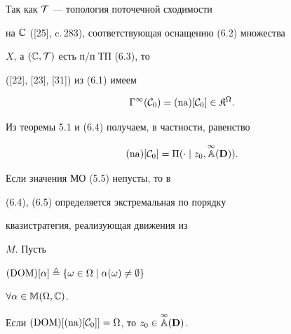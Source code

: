 Так как ${\cal T}$ --- топология поточечной сходимости


на ${\Bbb C}$ ([25], c.\,283), соответствующая оснащению (6.2) множества


$X$, а $({\Bbb C},{\cal T})$ есть п/п ТП (6.3), то


([22], [23], [31]) из (6.1) имеем


\begin{equation}


{{\Gm}^\infty}({\cal C}_0) = (\na)[{\cal C}_0] \in {{\frak K}^\Om}.


\end{equation}


Из теоремы 5.1 и (6.4) получаем, в частности, равенство


\begin{equation}


(\na)[{\cal C}_0] = {\Pi}(\cdot \mid {z_0},\up{\infty}{\Bbb A}({\bold


D})).


\end{equation}


Если значения МО (5.5) непусты, то в


(6.4), (6.5) определяется экстремальная по порядку


квазистратегия, реализующая движения из


$M$. Пусть


${(\DOM)[\alpha]}


\stac \{\omega \in \Om \mid {{\alpha}(\omega)} \ne \emp\}$


$\forall{\alpha} \in {\Bbb M}(\Omega,{\Bbb C})$.





\begin{props}


Если ${(\DOM)[(\na)[{\cal C}_0]]} = \Om$, то ${z_0} \in


\up{\infty}{\Bbb A}({\bold D})$.


\end{props}





